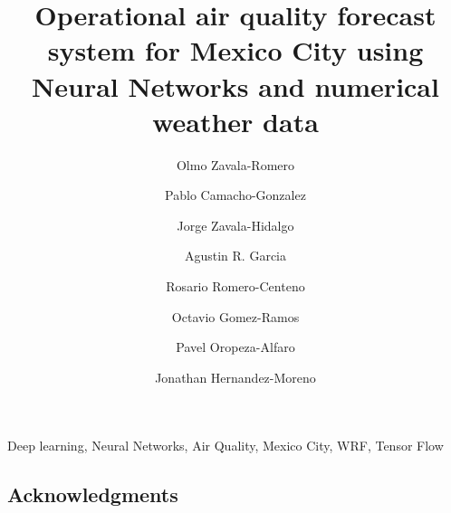 \documentclass[review,authoryear,5p,times,twocolumn]{elsarticle}
\begin{document}
\begin{frontmatter}

    \title{ Operational air quality forecast system for Mexico City using Neural 
    Networks and numerical weather data}


    \author[unamadd]{ Olmo Zavala-Romero} 
    \author[unamadd]{ Pablo Camacho-Gonzalez} 
    \author[unamadd]{ Jorge Zavala-Hidalgo} 
    \author[unamadd]{ Agustin R. Garcia} 
    \author[unamadd]{ Rosario Romero-Centeno} 
    \author[unamadd]{ Octavio Gomez-Ramos} 
    \author[unamadd]{ Pavel Oropeza-Alfaro} 
    \author[unamadd]{ Jonathan Hernandez-Moreno} 

    \address[unamadd]{Center of Atmospheric Sciences, Universidad Nacional Aut\'onoma de M\'exico}

    

    \begin{keyword}
        Deep learning, Neural Networks, Air Quality, Mexico City, WRF, Tensor Flow
    \end{keyword}

\end{frontmatter}









\subsection*{Acknowledgments}



\end{document}
